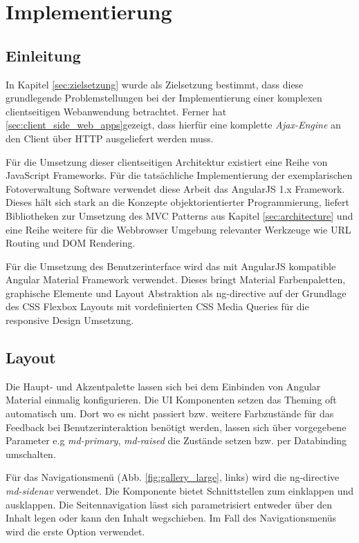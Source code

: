 \chapter{Implementierung}

\section{Einleitung}

In Kapitel \ref{sec:zielsetzung} wurde als Zielsetzung bestimmt, dass diese grundlegende Problemstellungen bei der Implementierung einer komplexen clientseitigen Webanwendung betrachtet. Ferner hat \ref{sec:client_side_web_apps}gezeigt, dass hierfür eine komplette \textit{Ajax-Engine} an den Client über HTTP ausgeliefert werden muss. 

Für die Umsetzung dieser clientseitigen Architektur existiert eine Reihe von JavaScript Frameworks. Für die tatsächliche Implementierung der exemplarischen Fotoverwaltung Software verwendet diese Arbeit das AngularJS 1.x Framework. Dieses hält sich stark an die Konzepte objektorientierter Programmierung, liefert Bibliotheken zur Umsetzung des MVC Patterns aus Kapitel \ref{sec:architecture} und eine Reihe weitere für die Webbrowser Umgebung relevanter Werkzeuge wie URL Routing und DOM Rendering.

Für die Umsetzung des Benutzerinterface wird das mit AngularJS kompatible Angular Material Framework verwendet. Dieses bringt Material Farbenpaletten, graphische Elemente und Layout Abstraktion als \gls{ng-directive} auf der Grundlage des CSS Flexbox Layouts mit vordefinierten CSS Media Queries für die responsive Design Umsetzung.

\section{Layout}

Die Haupt- und Akzentpalette lassen sich bei dem Einbinden von Angular Material einmalig konfigurieren. Die UI Komponenten setzen das Theming oft automatisch um.
Dort wo es nicht passiert bzw. weitere Farbzustände für das Feedback bei Benutzerinteraktion benötigt werden, lassen sich über vorgegebene Parameter e.g \textit{md-primary}, \textit{md-raised} die Zustände setzen bzw. per Databinding umschalten.

Für das Navigationsmenü (Abb. \ref{fig:gallery_large}, links) wird die \gls{ng-directive} \textit{md-sidenav} verwendet. Die Komponente bietet Schnittstellen zum einklappen und ausklappen. Die Seitennavigation lässt sich parametrisiert entweder über den Inhalt legen oder kann den Inhalt wegschieben. Im Fall des Navigationsmenüs wird die erste Option verwendet. 

